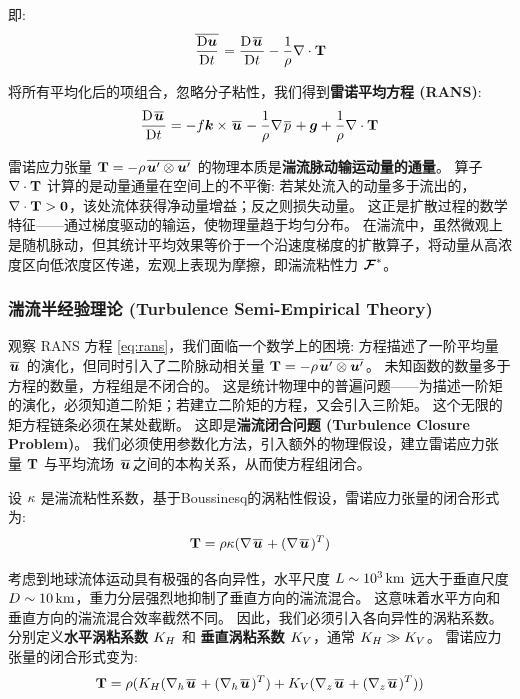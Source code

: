 即:
\begin{equation}
    \mkern2mu \overline{\frac{\mathrm{D} \bm{u}}{\mathrm{D} t}} \mkern2mu = \frac{\mathrm{D} \mkern2mu \overline{\bm{u}} \mkern2mu}{\mathrm{D} t} - \frac{1}{\rho} \nabla \cdot \mathbf{T}
    \label{eq:material_derivative_mean}
\end{equation}

将所有平均化后的项组合，忽略分子粘性，我们得到\textbf{雷诺平均方程 (RANS)}:
\begin{equation}
    \frac{\mathrm{D} \mkern2mu \overline{\bm{u}} \mkern2mu}{\mathrm{D} t} = -f \bm{k} \times \mkern2mu \overline{\bm{u}} \mkern2mu -\frac{1}{\rho} \nabla \mkern2mu \overline{p} \mkern2mu + \bm{g} + \frac{1}{\rho} \nabla \cdot \mathbf{T}
    \label{eq:rans}
\end{equation}

雷诺应力张量 $\mathbf{T} = -\rho \mkern2mu \overline{\bm{u}' \otimes \bm{u}'} \mkern2mu$ 的物理本质是\textbf{湍流脉动输运动量的通量}。
算子 $\nabla \cdot \mathbf{T}$ 计算的是动量通量在空间上的不平衡: 若某处流入的动量多于流出的，$\nabla \cdot \mathbf{T} > \bm{0}$，该处流体获得净动量增益；反之则损失动量。
这正是扩散过程的数学特征——通过梯度驱动的输运，使物理量趋于均匀分布。
在湍流中，虽然微观上是随机脉动，但其统计平均效果等价于一个沿速度梯度的扩散算子，将动量从高浓度区向低浓度区传递，宏观上表现为摩擦，即湍流粘性力 $\bm{\mathcal{F}}^{\ast}$。

\subsubsection{湍流半经验理论 (Turbulence Semi-Empirical Theory)}

观察 RANS 方程 \eqref{eq:rans}，我们面临一个数学上的困境: 方程描述了一阶平均量 $\mkern2mu \overline{\bm{u}} \mkern2mu$ 的演化，但同时引入了二阶脉动相关量 $\mathbf{T} = -\rho \mkern2mu \overline{\bm{u}' \otimes \bm{u}'} \mkern2mu$。
未知函数的数量多于方程的数量，方程组是不闭合的。
这是统计物理中的普遍问题——为描述一阶矩的演化，必须知道二阶矩；若建立二阶矩的方程，又会引入三阶矩。
这个无限的矩方程链条必须在某处截断。
这即是\textbf{湍流闭合问题 (Turbulence Closure Problem)}。
我们必须使用参数化方法，引入额外的物理假设，建立雷诺应力张量 $\mathbf{T}$ 与平均流场 $\mkern2mu \overline{\bm{u}} \mkern2mu$之间的本构关系，从而使方程组闭合。

设 $\kappa$ 是湍流粘性系数，基于Boussinesq的涡粘性假设，雷诺应力张量的闭合形式为:
\begin{equation}
    \mathbf{T} = \rho \kappa (\nabla \mkern2mu \overline{\bm{u}} \mkern2mu + (\nabla \mkern2mu \overline{\bm{u}} \mkern2mu)^T)
    \label{eq:reynolds_stress_tensor_closed}
\end{equation}

考虑到地球流体运动具有极强的各向异性，水平尺度 $L \sim 10^3\,\mathrm{km}$ 远大于垂直尺度 $D \sim 10\,\mathrm{km}$，重力分层强烈地抑制了垂直方向的湍流混合。
这意味着水平方向和垂直方向的湍流混合效率截然不同。
因此，我们必须引入各向异性的涡粘系数。
分别定义\textbf{水平涡粘系数 $K_H$} 和 \textbf{垂直涡粘系数 $K_V$}，通常 $K_H \gg K_V$。
雷诺应力张量的闭合形式变为:
\begin{equation}
    \mathbf{T} = \rho (K_H (\nabla_h \mkern2mu \overline{\bm{u}} \mkern2mu + (\nabla_h \mkern2mu \overline{\bm{u}} \mkern2mu)^T) + K_V (\nabla_z \mkern2mu \overline{\bm{u}} \mkern2mu + (\nabla_z \mkern2mu \overline{\bm{u}} \mkern2mu)^T))
    \label{eq:reynolds_stress_tensor_closed_hv}
\end{equation}

